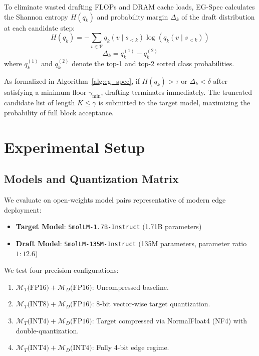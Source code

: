 \documentclass[10pt,twocolumn,letterpaper]{article}
\begin{document}
To eliminate wasted drafting FLOPs and DRAM cache loads, EG-Spec calculates the Shannon entropy $H(q_k)$ and probability margin $\Delta_k$ of the draft distribution at each candidate step:
\begin{equation}
H(q_k) = -\sum_{v \in \mathcal{V}} q_k(v \mid s_{<k}) \log(q_k(v \mid s_{<k}))
\end{equation}
\begin{equation}
\Delta_k = q_k^{(1)} - q_k^{(2)}
\end{equation}
where $q_k^{(1)}$ and $q_k^{(2)}$ denote the top-1 and top-2 sorted class probabilities. 

As formalized in Algorithm~\ref{alg:eg_spec}, if $H(q_k) > \tau$ or $\Delta_k < \delta$ after satisfying a minimum floor $\gamma_{\min}$, drafting terminates immediately. The truncated candidate list of length $K \le \gamma$ is submitted to the target model, maximizing the probability of full block acceptance.

\section{Experimental Setup}

\subsection{Models and Quantization Matrix}
We evaluate on open-weights model pairs representative of modern edge deployment:
\begin{itemize}
    \item \textbf{Target Model}: \texttt{SmolLM-1.7B-Instruct} (1.71B parameters)
    \item \textbf{Draft Model}: \texttt{SmolLM-135M-Instruct} (135M parameters, parameter ratio $1:12.6$)
\end{itemize}
We test four precision configurations:
\begin{enumerate}
    \item $\mathcal{M}_T \text{(FP16)} + \mathcal{M}_D \text{(FP16)}$: Uncompressed baseline.
    \item $\mathcal{M}_T \text{(INT8)} + \mathcal{M}_D \text{(FP16)}$: 8-bit vector-wise target quantization.
    \item $\mathcal{M}_T \text{(INT4)} + \mathcal{M}_D \text{(FP16)}$: Target compressed via NormalFloat4 (NF4) with double-quantization.
    \item $\mathcal{M}_T \text{(INT4)} + \mathcal{M}_D \text{(INT4)}$: Fully 4-bit edge regime.
\end{enumerate}
\end{document}
